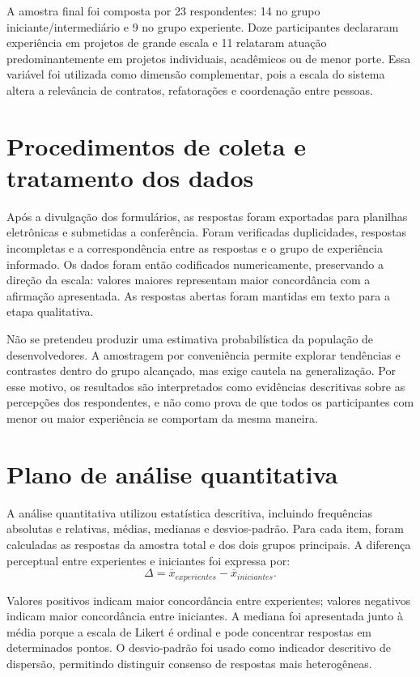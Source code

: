A amostra final foi composta por 23 respondentes: 14 no grupo iniciante/intermediário e 9 no grupo experiente. Doze participantes declararam experiência em projetos de grande escala e 11 relataram atuação predominantemente em projetos individuais, acadêmicos ou de menor porte. Essa variável foi utilizada como dimensão complementar, pois a escala do sistema altera a relevância de contratos, refatorações e coordenação entre pessoas.

\section{Procedimentos de coleta e tratamento dos dados}

Após a divulgação dos formulários, as respostas foram exportadas para planilhas eletrônicas e submetidas a conferência. Foram verificadas duplicidades, respostas incompletas e a correspondência entre as respostas e o grupo de experiência informado. Os dados foram então codificados numericamente, preservando a direção da escala: valores maiores representam maior concordância com a afirmação apresentada. As respostas abertas foram mantidas em texto para a etapa qualitativa.

Não se pretendeu produzir uma estimativa probabilística da população de desenvolvedores. A amostragem por conveniência permite explorar tendências e contrastes dentro do grupo alcançado, mas exige cautela na generalização. Por esse motivo, os resultados são interpretados como evidências descritivas sobre as percepções dos respondentes, e não como prova de que todos os participantes com menor ou maior experiência se comportam da mesma maneira.

\section{Plano de análise quantitativa}

A análise quantitativa utilizou estatística descritiva, incluindo frequências absolutas e relativas, médias, medianas e desvios-padrão. Para cada item, foram calculadas as respostas da amostra total e dos dois grupos principais. A diferença perceptual entre experientes e iniciantes foi expressa por:
\[
\Delta = \overline{x}_{experientes} - \overline{x}_{iniciantes}.
\]

Valores positivos indicam maior concordância entre experientes; valores negativos indicam maior concordância entre iniciantes. A mediana foi apresentada junto à média porque a escala de Likert é ordinal e pode concentrar respostas em determinados pontos. O desvio-padrão foi usado como indicador descritivo de dispersão, permitindo distinguir consenso de respostas mais heterogêneas.

